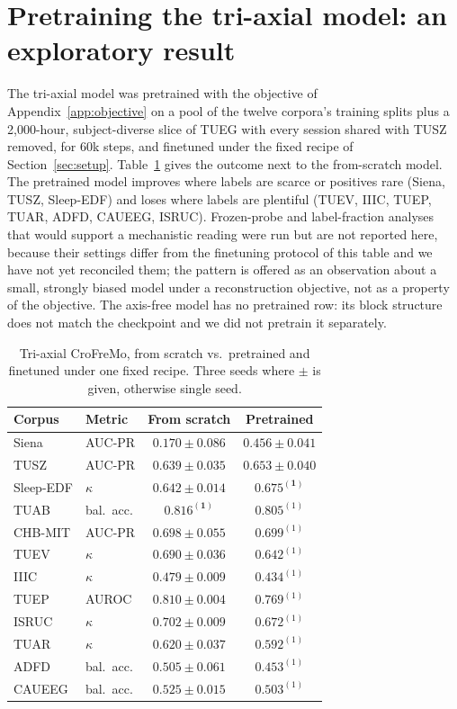 \section{Pretraining the tri-axial model: an exploratory result}
\label{app:pretrain}

The tri-axial model was pretrained with the objective of
Appendix~\ref{app:objective} on a pool of the twelve corpora's training
splits plus a 2,000-hour, subject-diverse slice of TUEG with every session
shared with TUSZ removed, for 60k steps, and finetuned under the fixed
recipe of Section~\ref{sec:setup}. Table~\ref{tab:pretrain-triaxial}
gives the outcome next to the from-scratch model. The pretrained model
improves where labels are scarce or positives rare (Siena, TUSZ,
Sleep-EDF) and loses where labels are plentiful (TUEV, IIIC, TUEP, TUAR,
ADFD, CAUEEG, ISRUC). Frozen-probe and label-fraction analyses that would
support a mechanistic reading were run but are not reported here, because
their settings differ from the finetuning protocol of this table and we
have not yet reconciled them; the pattern is offered as an observation
about a small, strongly biased model under a reconstruction objective,
not as a property of the objective. The axis-free model has no
pretrained row: its block structure does not match the checkpoint and we
did not pretrain it separately.

\begin{table}[h]
\centering
\small
\caption{Tri-axial CroFreMo, from scratch vs.\ pretrained and finetuned
under one fixed recipe. Three seeds where $\pm$ is given, otherwise single
seed.}
\label{tab:pretrain-triaxial}
\begin{tabular}{llcc}
\toprule
Corpus & Metric & From scratch & Pretrained \\
\midrule
Siena & AUC-PR & $0.170 \pm 0.086$ & $\mathbf{0.456 \pm 0.041}$ \\
TUSZ & AUC-PR & $0.639 \pm 0.035$ & $\mathbf{0.653 \pm 0.040}$ \\
Sleep-EDF & $\kappa$ & $0.642 \pm 0.014$ & $\mathbf{0.675^{(1)}}$ \\
TUAB & bal.\ acc. & $\mathbf{0.816^{(1)}}$ & $0.805^{(1)}$ \\
CHB-MIT & AUC-PR & $0.698 \pm 0.055$ & $0.699^{(1)}$ \\
TUEV & $\kappa$ & $\mathbf{0.690 \pm 0.036}$ & $0.642^{(1)}$ \\
IIIC & $\kappa$ & $\mathbf{0.479 \pm 0.009}$ & $0.434^{(1)}$ \\
TUEP & AUROC & $\mathbf{0.810 \pm 0.004}$ & $0.769^{(1)}$ \\
ISRUC & $\kappa$ & $\mathbf{0.702 \pm 0.009}$ & $0.672^{(1)}$ \\
TUAR & $\kappa$ & $\mathbf{0.620 \pm 0.037}$ & $0.592^{(1)}$ \\
ADFD & bal.\ acc. & $\mathbf{0.505 \pm 0.061}$ & $0.453^{(1)}$ \\
CAUEEG & bal.\ acc. & $\mathbf{0.525 \pm 0.015}$ & $0.503^{(1)}$ \\
\bottomrule
\end{tabular}
\end{table}

